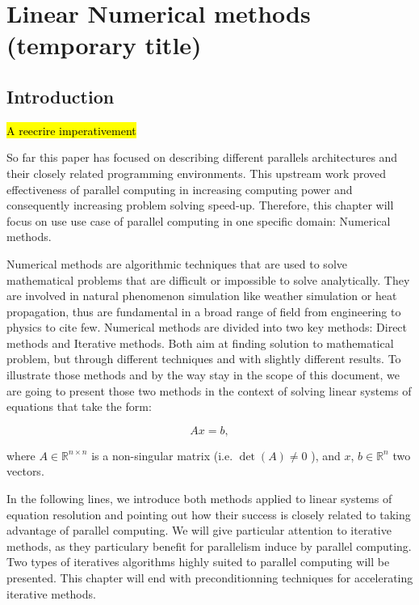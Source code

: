 \chapter{Linear Numerical methods (temporary title)}


\section{Introduction}

\hl{A reecrire imperativement}

So far this paper has focused on describing different parallels architectures and their closely related programming environments. This upstream work proved effectiveness of parallel computing in increasing computing power and consequently increasing problem solving speed-up. Therefore, this chapter will focus on use use case of parallel computing in one specific domain: Numerical methods.

Numerical methods are algorithmic techniques that are used to solve mathematical problems that are difficult or impossible to solve analytically. They are involved in natural phenomenon simulation like weather simulation or heat propagation, thus are fundamental in a broad range of field from engineering to physics to cite few. Numerical methods are divided into two key methods: Direct methods and Iterative methods. Both aim at finding solution to mathematical problem, but through different techniques and with slightly different results. To illustrate those methods and by the way stay in the scope of this document, we are going to present those two methods in the context of solving linear systems of equations that take the form:

\begin{equation}
Ax = b,
\label{eq:linearequation}
\end{equation} 

where $A \in \mathbb{R}^{n \times n}$ is a non-singular matrix (i.e. $\det(A) \neq 0$ ), and $x$, $b \in \mathbb{R}^{n}$ two vectors.

In the following lines, we introduce both methods applied to linear systems of equation resolution and pointing out how their success is closely related to taking advantage of parallel computing. We will give particular attention to iterative methods, as they particulary benefit for parallelism induce by parallel computing. Two types of iteratives algorithms highly suited to parallel computing will be presented. This chapter will end with preconditionning techniques for accelerating iterative methods.




